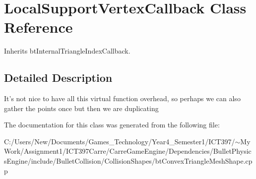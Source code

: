 \hypertarget{class_local_support_vertex_callback}{
\section{LocalSupportVertexCallback Class Reference}
\label{class_local_support_vertex_callback}
}
Inherits btInternalTriangleIndexCallback.



\subsection{Detailed Description}
It's not nice to have all this virtual function overhead, so perhaps we can also gather the points once but then we are duplicating 

The documentation for this class was generated from the following file:\begin{CompactItemize}
\item 
C:/Users/New/Documents/Games\_\-Technology/Year4\_\-Semester1/ICT397/$\sim$My Work/Assignment1/ICT397Carre/CarreGameEngine/Dependencies/BulletPhysicsEngine/include/BulletCollision/CollisionShapes/btConvexTriangleMeshShape.cpp\end{CompactItemize}
